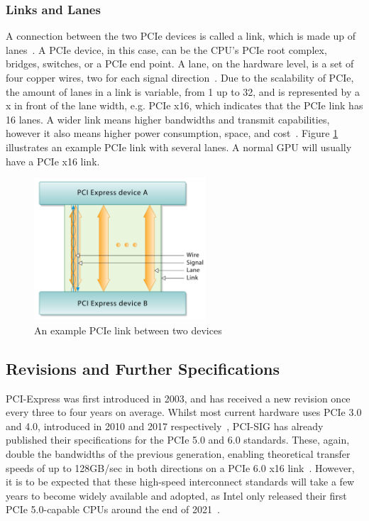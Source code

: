 \subsubsection{Links and Lanes}
A connection between the two PCIe devices is called a link, which is made up of lanes~\cite{jackson_pci_2012}. A PCIe device, in this case, can be the CPU's PCIe root complex, bridges, switches, or a PCIe end point. A lane, on the hardware level, is a set of four copper wires, two for each signal direction~\cite{jackson_pci_2012}. Due to the scalability of PCIe, the amount of lanes in a link is variable, from 1 up to 32, and is represented by a x in front of the lane width, e.g. PCIe x16, which indicates that the PCIe link has 16 lanes. A wider link means higher bandwidths and transmit capabilities, however it also means higher power consumption, space, and cost~\cite{jackson_pci_2012}. Figure \ref{fig:link} illustrates an example PCIe link with several lanes. A normal GPU will usually have a PCIe x16 link.


\begin{figure}[htpb]
\begin{center}
\includegraphics[height = 200px]{figures/PCIE-link}
\caption{An example PCIe link between two devices~\cite{budruk_pci_2014}}
\label{fig:link}
\end{center}
\end{figure}

\subsection{Revisions and Further Specifications}

PCI-Express was first introduced in 2003, and has received a new revision once every three to four years on average. Whilst most current hardware uses PCIe 3.0 and 4.0, introduced in 2010 and 2017 respectively~\cite{sharma_pci_2020}, PCI-SIG has already published their specifications for the PCIe 5.0 and 6.0 standards. These, again, double the bandwidths of the previous generation, enabling theoretical transfer speeds of up to 128GB/sec in both directions on a PCIe 6.0 x16 link~\cite{sharma_pci_2020}. However, it is to be expected that these high-speed interconnect standards will take a few years to become widely available and adopted, as Intel only released their first PCIe 5.0-capable CPUs around the end of 2021~\cite{intel_product_2022}. 

